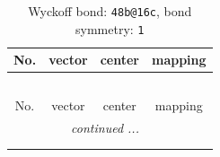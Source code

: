 \documentclass[fleqn,8pt]{jsarticle}
\begin{document}
\renewcommand{\arraystretch}{1.2}
\begin{longtable}{cccc}
\caption{Wyckoff bond: {\tt 48b@16c}, bond symmetry: {\tt 1}}
 \\
 \hline \hline
No. & vector & center & mapping \\ \hline \endfirsthead

\multicolumn{3}{l}{\tablename\ \thetable{}} \\
 \hline \hline
No. & vector & center & mapping \\ \hline \endhead

 \hline \hline
\multicolumn{3}{r}{\footnotesize\it continued ...} \\ \endfoot

 \hline \hline
\multicolumn{3}{r}{} \\ \endlastfoot


\end{longtable}
\end{document}
